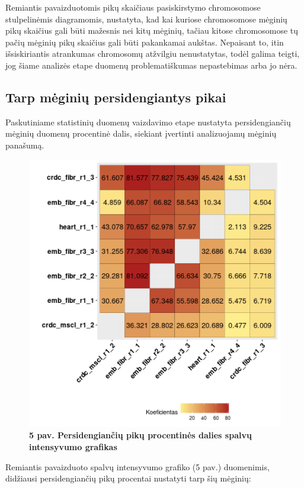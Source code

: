 \documentclass[12pt]{article}
\begin{document}
Remiantis pavaizduotomis pikų skaičiaus pasiskirstymo chromosomose
stulpelinėmis diagramomis, nustatyta, kad kai kuriose chromosomose mėginių
pikų skaičius gali būti mažesnis nei kitų mėginių, tačiau kitose chromosomose
tų pačių mėginių pikų skaičius gali būti pakankamai aukštas. Nepaisant to,
itin išsiskiriantis atrankumas chromosomų atžvilgiu nenustatytas, todėl galima
teigti, jog šiame analizės etape duomenų problematiškumas nepastebimas arba
jo nėra.

\newpage


\subsection{Tarp mėginių persidengiantys pikai}
Paskutiniame statistinių duomenų vaizdavimo etape nustatyta persidengiančių
mėginių duomenų procentinė dalis, siekiant įvertinti analizuojamų mėginių
panašumą.

\begin{figure}[htb]
    \begin{center}
        \includegraphics[width=0.6\linewidth]{../Figures/peak_overlaps.png}
        \vspace{-2\baselineskip}
        \caption*{\small\textbf{5 pav. Persidengiančių pikų procentinės
                                dalies spalvų intensyvumo grafikas}}
    \end{center}
\end{figure}

Remiantis pavaizduoto spalvų intensyvumo grafiko (5 pav.) duomenimis, didžiausi
persidengiančių pikų procentai nustatyti tarp šių mėginių:
\end{document}
